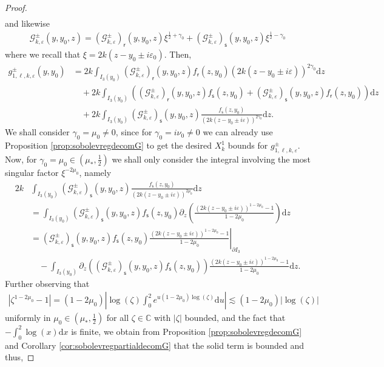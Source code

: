 \documentclass[11pt,reqno]{amsproc}
\theoremstyle{definition}
\numberwithin{equation}{section}
\newcommand{\C}{{\mathbb C}}
\newcommand{\G}{{\mathcal{G}}}
\newcommand{\sr}{{\mathsf{r}}}
\newcommand{\s}{{\mathsf{s}}}
\renewcommand{\d}{\mathrm{d}}
\newcommand{\ep}{\varepsilon}
\begin{document}
\begin{proof}
\begin{align*}
\end{align*}
and likewise
\begin{align*}
\G_{k,\ep}^\pm(y,y_0,z) = \left( \G_{k,\ep}^\pm\right)_{\sr}(y,y_0,z)\xi^{\frac12+\gamma_0} + \left( \G_{k,\ep}^\pm\right)_{\s}(y,y_0,z) \xi^{\frac12-\gamma_0}
\end{align*}
where we recall that $\xi=2k(z-y_0\pm i\ep_0)$. Then,
\begin{align*}
g_{1,\ell,k,\ep}^\pm(y,y_0) &= 2k\int_{I_3(y_0)} \left( \G_{k,\ep}^\pm\right)_{\sr}(y,y_0,z)f_\sr(z,y_0)(2k(z-y_0\pm i\ep))^{2\gamma_0} \d z \\
&\quad +2k \int_{I_3(y_0)} \left( \left( \G_{k,\ep}^\pm\right)_{\sr}(y,y_0,z) f_\s(z,y_0) + \left( \G_{k,\ep}^\pm\right)_{\s}(y,y_0,z) f_\sr(z,y_0)  \right) \d z \\
&\quad+ 2k\int_{I_3(y_0)} \left( \G_{k,\ep}^\pm\right)_{\s}(y,y_0,z)\frac{f_\s(z,y_0)}{(2k(z-y_0\pm i\ep))^{2\gamma_0}} \d z.
\end{align*}
We shall consider $\gamma_0 = \mu_0 \neq 0$, since for $\gamma_0=i\nu_0\neq0$ we can already use Proposition \ref{prop:sobolevregdecomG} to get the desired $X_k^1$ bounds for $g_{1,\ell,k,\ep}^\pm$. Now, for $\gamma_0=\mu_0\in (\mu_*,\tfrac12)$ we shall only consider the integral involving the most singular factor $\xi^{-2\mu_0}$, namely
\begin{align*}
2k&\int_{I_3(y_0)} \left( \G_{k,\ep}^\pm\right)_{\s}(y,y_0,z)\frac{f_\s(z,y_0)}{(2k(z-y_0\pm i\ep))^{2\mu_0}} \d z \\
&= \int_{I_3(y_0)} \left( \G_{k,\ep}^\pm\right)_{\s}(y,y_0,z)f_\s(z,y_0) \partial_z \left( \frac{(2k(z-y_0\pm i\ep))^{1-2\mu_0} - 1}{1-2\mu_0} \right) \d z \\
&= \left. \left( \G_{k,\ep}^\pm\right)_{\s}(y,y_0,z)f_\s(z,y_0)  \frac{(2k(z-y_0\pm i\ep))^{1-2\mu_0} - 1}{1-2\mu_0} \right|_{\partial I_3} \\
&\quad -  \int_{I_3(y_0)} \partial_z \left( \left( \G_{k,\ep}^\pm\right)_{\s}(y,y_0,z)f_\s(z,y_0) \right)  \frac{(2k(z-y_0\pm i\ep))^{1-2\mu_0} - 1}{1-2\mu_0}  \d z.
\end{align*}
 Further observing that 
\begin{align*}
\left |\zeta^{1-2\mu_0} - 1 \right| = (1-2\mu_0)\left| \log(\zeta) \int_0^2 e^{u(1-2\mu_0)\log(\zeta)} \d u \right| \lesssim (1-2\mu_0)|\log(\zeta)|
\end{align*}
uniformly in $\mu_0\in (\mu_*,\tfrac12)$ for all $\zeta\in \C$ with $|\zeta|$ bounded, and the fact that $-\int_0^2\log(x) \d x$ is finite, we obtain from Proposition \ref{prop:sobolevregdecomG} and Corollary \ref{cor:sobolevregpartialdecomG} that the solid term is bounded and thus, 

\end{proof}
\end{document}
